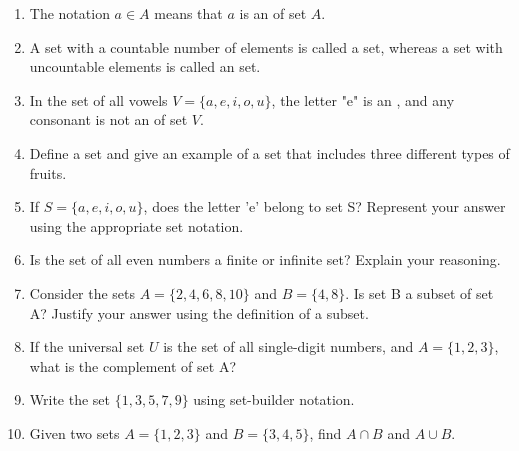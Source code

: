 \documentclass{article}
\begin{document}
\begin{enumerate}
    \item The notation \( a \in A \) means that \( a \) is an \underline{\hspace{1cm}} of set \( A \).\\[1em]

    \item A set with a countable number of elements is called a \underline{\hspace{1cm}} set, whereas a set with uncountable elements is called an \underline{\hspace{1cm}} set.\\[1em]

    \item In the set of all vowels \( V = \{ a, e, i, o, u \} \), the letter "e" is an \underline{\hspace{1cm}}, and any consonant is not an \underline{\hspace{1cm}} of set \( V \).\\[1em]
    \item Define a set and give an example of a set that includes three different types of fruits.\\[1em]

    \item If \( S = \{ a, e, i, o, u \} \), does the letter 'e' belong to set S? Represent your answer using the appropriate set notation.\\[1em]

    \item Is the set of all even numbers a finite or infinite set? Explain your reasoning.\\[1em]

    \item Consider the sets \( A = \{ 2, 4, 6, 8, 10 \} \) and \( B = \{ 4, 8 \} \). Is set B a subset of set A? Justify your answer using the definition of a subset.\\[1em]

    \item If the universal set \( U \) is the set of all single-digit numbers, and \( A = \{ 1, 2, 3 \} \), what is the complement of set A?\\[1em]

    \item Write the set \( \{ 1, 3, 5, 7, 9 \} \) using set-builder notation.\\[1em]

    \item Given two sets \( A = \{ 1, 2, 3 \} \) and \( B = \{ 3, 4, 5 \} \), find \( A \cap B \) and \( A \cup B \).\\[1em]


\end{enumerate}
\end{document}
